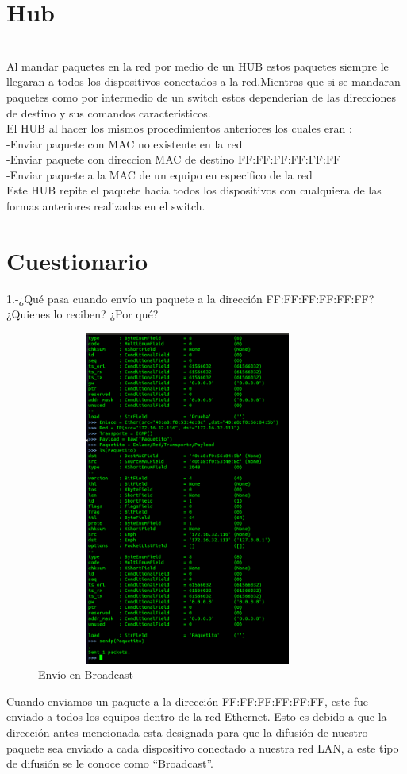 \documentclass{udpreport}
\begin{document}
	\section{Hub}\\
	 	Al mandar paquetes en la red por medio de un HUB estos paquetes siempre 
 		le llegaran a todos los dispositivos conectados a la red.Mientras que si
 		se mandaran paquetes como por intermedio de un switch estos dependerian de 
 		las direcciones de destino  y sus comandos caracteristicos.\\
 		El HUB al hacer  los mismos procedimientos anteriores los cuales eran :\\
 		-Enviar paquete con MAC no existente en la red\\
 		-Enviar paquete con direccion MAC de destino FF:FF:FF:FF:FF:FF\\
 		-Enviar paquete a la MAC de un equipo en especifico de la red\\
 		Este HUB repite el paquete hacia todos los dispositivos con cualquiera
 		de las formas anteriores realizadas en el switch.
	\section{Cuestionario}
	
	  1.-¿Qué pasa cuando envío un paquete a la dirección FF:FF:FF:FF:FF:FF? ¿Quienes
	     lo reciben? ¿Por qué?\\
    	 	\begin{figure}[H]
	        	\centering
	        	\includegraphics[width=10cm, height=11cm]{EnvioPaquetito.png}
			\caption{Envío en Broadcast}
	 	\end{figure}
	     Cuando enviamos un paquete a la dirección FF:FF:FF:FF:FF:FF, este fue enviado a todos los equipos dentro de la red
	     Ethernet. Esto es debido a que la dirección antes mencionada esta designada para que la difusión de nuestro paquete sea
 	     enviado a cada dispositivo conectado a nuestra red LAN, a este tipo de difusión se le conoce como “Broadcast”.\\
 
\end{document}
